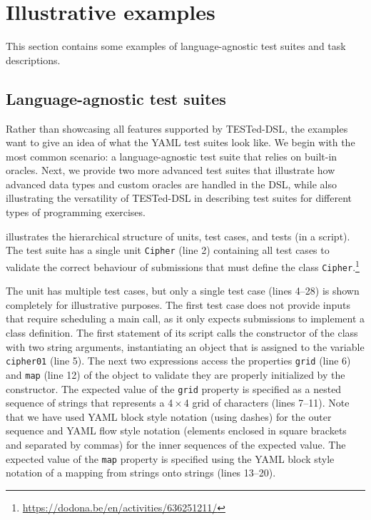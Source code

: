 \documentclass[../main]{subfiles}
\begin{document}
\section{Illustrative examples}\label{sec:dsl-illustrative-examples}

This section contains some examples of language-agnostic test suites and task descriptions.

\subsection{Language-agnostic test suites}\label{subsec:example-language-agnostic-test-suites}

Rather than showcasing all features supported by TESTed-DSL, the examples want to give an idea of what the YAML test suites look like.
We begin with the most common scenario: a language-agnostic test suite that relies on built-in oracles.
Next, we provide two more advanced test suites that illustrate how advanced data types and custom oracles are handled in the DSL, while also illustrating the versatility of TESTed-DSL in describing test suites for different types of programming exercises.

 illustrates the hierarchical structure of units, test cases, and tests (in a script).
The test suite has a single unit \texttt{Cipher} (line 2) containing all test cases to validate the correct behaviour of submissions that must define the class \texttt{Cipher}.\footnote{\url{https://dodona.be/en/activities/636251211/}}

The unit has multiple test cases, but only a single test case (lines 4--28) is shown completely for illustrative purposes.
The first test case does not provide inputs that require scheduling a main call, as it only expects submissions to implement a class definition.
The first statement of its script calls the constructor of the class with two string arguments, instantiating an object that is assigned to the variable \texttt{cipher01} (line 5).
The next two expressions access the properties \texttt{grid} (line 6) and \texttt{map} (line 12) of the object to validate they are properly initialized by the constructor.
The expected value of the \texttt{grid} property is specified as a nested sequence of strings that represents a 4\,×\,4 grid of characters (lines 7--11).
Note that we have used YAML block style notation (using dashes) for the outer sequence and YAML flow style notation (elements enclosed in square brackets and separated by commas) for the inner sequences of the expected value.
The expected value of the \texttt{map} property is specified using the YAML block style notation of a mapping from strings onto strings (lines 13--20).
\end{document}
